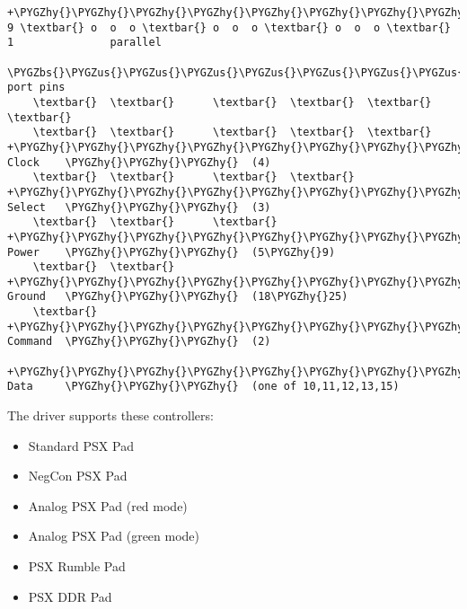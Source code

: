 \documentclass[a4paper,8pt,english]{sphinxmanual}
\def\PYGZbs{\char`\\}
\def\PYGZus{\char`\_}
\def\PYGZgt{\char`\>}
\def\PYGZhy{\char`\-}
\begin{document}
\begin{Verbatim}[commandchars=\\\{\}]
  +\PYGZhy{}\PYGZhy{}\PYGZhy{}\PYGZhy{}\PYGZhy{}\PYGZhy{}\PYGZhy{}\PYGZhy{}\PYGZhy{}+\PYGZhy{}\PYGZhy{}\PYGZhy{}\PYGZhy{}\PYGZhy{}\PYGZhy{}\PYGZhy{}\PYGZhy{}\PYGZhy{}+\PYGZhy{}\PYGZhy{}\PYGZhy{}\PYGZhy{}\PYGZhy{}\PYGZhy{}\PYGZhy{}\PYGZhy{}\PYGZhy{}+
9 \textbar{} o  o  o \textbar{} o  o  o \textbar{} o  o  o \textbar{} 1               parallel
   \PYGZbs{}\PYGZus{}\PYGZus{}\PYGZus{}\PYGZus{}\PYGZus{}\PYGZus{}\PYGZus{}\PYGZus{}\textbar{}\PYGZus{}\PYGZus{}\PYGZus{}\PYGZus{}\PYGZus{}\PYGZus{}\PYGZus{}\PYGZus{}\PYGZus{}\textbar{}\PYGZus{}\PYGZus{}\PYGZus{}\PYGZus{}\PYGZus{}\PYGZus{}\PYGZus{}\PYGZus{}/                  port pins
    \textbar{}  \textbar{}      \textbar{}  \textbar{}  \textbar{}   \textbar{}
    \textbar{}  \textbar{}      \textbar{}  \textbar{}  \textbar{}   +\PYGZhy{}\PYGZhy{}\PYGZhy{}\PYGZhy{}\PYGZhy{}\PYGZhy{}\PYGZhy{}\PYGZhy{}\PYGZgt{}  Clock    \PYGZhy{}\PYGZhy{}\PYGZhy{}  (4)
    \textbar{}  \textbar{}      \textbar{}  \textbar{}  +\PYGZhy{}\PYGZhy{}\PYGZhy{}\PYGZhy{}\PYGZhy{}\PYGZhy{}\PYGZhy{}\PYGZhy{}\PYGZhy{}\PYGZhy{}\PYGZhy{}\PYGZhy{}\PYGZgt{}  Select   \PYGZhy{}\PYGZhy{}\PYGZhy{}  (3)
    \textbar{}  \textbar{}      \textbar{}  +\PYGZhy{}\PYGZhy{}\PYGZhy{}\PYGZhy{}\PYGZhy{}\PYGZhy{}\PYGZhy{}\PYGZhy{}\PYGZhy{}\PYGZhy{}\PYGZhy{}\PYGZhy{}\PYGZhy{}\PYGZhy{}\PYGZhy{}\PYGZgt{}  Power    \PYGZhy{}\PYGZhy{}\PYGZhy{}  (5\PYGZhy{}9)
    \textbar{}  \textbar{}      +\PYGZhy{}\PYGZhy{}\PYGZhy{}\PYGZhy{}\PYGZhy{}\PYGZhy{}\PYGZhy{}\PYGZhy{}\PYGZhy{}\PYGZhy{}\PYGZhy{}\PYGZhy{}\PYGZhy{}\PYGZhy{}\PYGZhy{}\PYGZhy{}\PYGZhy{}\PYGZhy{}\PYGZgt{}  Ground   \PYGZhy{}\PYGZhy{}\PYGZhy{}  (18\PYGZhy{}25)
    \textbar{}  +\PYGZhy{}\PYGZhy{}\PYGZhy{}\PYGZhy{}\PYGZhy{}\PYGZhy{}\PYGZhy{}\PYGZhy{}\PYGZhy{}\PYGZhy{}\PYGZhy{}\PYGZhy{}\PYGZhy{}\PYGZhy{}\PYGZhy{}\PYGZhy{}\PYGZhy{}\PYGZhy{}\PYGZhy{}\PYGZhy{}\PYGZhy{}\PYGZhy{}\PYGZhy{}\PYGZhy{}\PYGZhy{}\PYGZgt{}  Command  \PYGZhy{}\PYGZhy{}\PYGZhy{}  (2)
    +\PYGZhy{}\PYGZhy{}\PYGZhy{}\PYGZhy{}\PYGZhy{}\PYGZhy{}\PYGZhy{}\PYGZhy{}\PYGZhy{}\PYGZhy{}\PYGZhy{}\PYGZhy{}\PYGZhy{}\PYGZhy{}\PYGZhy{}\PYGZhy{}\PYGZhy{}\PYGZhy{}\PYGZhy{}\PYGZhy{}\PYGZhy{}\PYGZhy{}\PYGZhy{}\PYGZhy{}\PYGZhy{}\PYGZhy{}\PYGZhy{}\PYGZhy{}\PYGZgt{}  Data     \PYGZhy{}\PYGZhy{}\PYGZhy{}  (one of 10,11,12,13,15)
\end{Verbatim}

The driver supports these controllers:
\begin{itemize}
\item {} 
Standard PSX Pad

\item {} 
NegCon PSX Pad

\item {} 
Analog PSX Pad (red mode)

\item {} 
Analog PSX Pad (green mode)

\item {} 
PSX Rumble Pad

\item {} 
PSX DDR Pad

\end{itemize}
\end{document}
